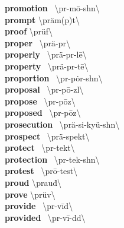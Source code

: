 \documentclass[10pt,a4paper]{article}
\begin{document}
\begin{multicols}{2}
\textbf{ promotion }\quad \ \textbackslash pr\textschwa -\textprimstress m\={o}-sh\textschwa n\textbackslash \\
\textbf{ prompt }\quad \textbackslash \textprimstress pr\"{a}m(p)t\textbackslash \\
\textbf{ proof }\quad \textbackslash \textprimstress pr\"{u}f\textbackslash \\
\textbf{ proper }\quad \ \textbackslash \textprimstress pr\"{a}-p\textschwa r\textbackslash \\
\textbf{ properly }\quad \ \textbackslash \textprimstress pr\"{a}-p\textschwa r-l\={e}\textbackslash \\
\textbf{ property }\quad \ \textbackslash \textprimstress pr\"{a}-p\textschwa r-t\={e}\textbackslash \\
\textbf{ proportion }\quad \ \textbackslash pr\textschwa -\textprimstress p\.{o}r-sh\textschwa n\textbackslash \\
\textbf{ proposal }\quad \ \textbackslash pr\textschwa -\textprimstress p\={o}-z\textschwa l\textbackslash \\
\textbf{ propose }\quad \ \textbackslash pr\textschwa -\textprimstress p\={o}z\textbackslash \\
\textbf{ proposed }\quad \ \textbackslash pr\textschwa -\textprimstress p\={o}z\textbackslash \\
\textbf{ prosecution }\quad \ \textbackslash \textsecstress pr\"{a}-si-\textprimstress ky\"{u}-sh\textschwa n\textbackslash \\
\textbf{ prospect }\quad \ \textbackslash \textprimstress pr\"{a}-\textsecstress spekt\textbackslash \\
\textbf{ protect }\quad \ \textbackslash pr\textschwa -\textprimstress tekt\textbackslash \\
\textbf{ protection }\quad \ \textbackslash pr\textschwa -\textprimstress tek-sh\textschwa n\textbackslash \\
\textbf{ protest }\quad \ \textbackslash \textprimstress pr\={o}-\textsecstress test\textbackslash \\
\textbf{ proud }\quad \textbackslash \textprimstress prau\. d\textbackslash \\
\textbf{ prove }\quad \textbackslash \textprimstress pr\"{u}v\textbackslash \\
\textbf{ provide }\quad \ \textbackslash pr\textschwa -\textprimstress v\={i}d\textbackslash \\
\textbf{ provided }\quad \ \textbackslash pr\textschwa -\textprimstress v\={i}-d\textschwa d\textbackslash \\

\end{multicols}
\end{document}
